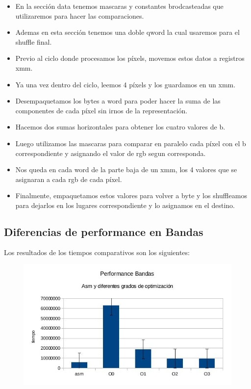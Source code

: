 \documentclass[a4paper]{article}
\begin{document}
\begin{itemize}
\item  En la sección data tenemos mascaras y constantes brodcasteadas que utilizaremos para hacer las comparaciones.
\item  Ademas en esta sección tenemos una doble qword la cual usaremos para el shuffle final.
\item  Previo al ciclo donde procesamos los píxels, movemos estos datos a registros xmm.
\item  Ya una vez dentro del ciclo, leemos 4 píxels y los guardamos en un xmm.
\item  Desempaquetamos los bytes a word para poder hacer la suma de las componentes de cada píxel sin irnos de la representación.
\item  Hacemos dos sumas horizontales para obtener los cuatro valores  de b.
\item  Luego utilizamos las mascaras para comparar en paralelo cada píxel con el b correspondiente y asignando el valor de rgb segun corresponda.
\item  Nos queda en cada word de la parte baja de un xmm, los 4 valores que se asignaran a cada rgb de cada píxel.
\item  Finalmente, empaquetamos estos valores para volver a byte y los shuffleamos para dejarlos en los lugares correspondiente y lo asignamos en el destino.
\end{itemize}

\subsection{Diferencias de performance en Bandas}

Los resultados de los tiempos comparativos son los siguientes:

\begin{figure}[h!]
  \begin{center}
  \includegraphics[scale=0.66]{Graficos1.4/ban/per.jpg}
  \label{nombreparareferenciar9}
  \end{center}
\end{figure}
\end{document}
